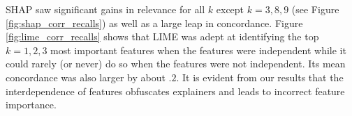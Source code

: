 \documentclass[mnsc,blindrev]{informs3}
\begin{document}
 SHAP saw significant gains in relevance for all $k$ except $k=3,8,9$ (see  Figure \ref{fig:shap_corr_recalls}) as well as a large leap in concordance. Figure \ref{fig:lime_corr_recalls} shows that LIME was adept at identifying the top $k=1,2,3$ most important features when the features were independent while it could rarely (or never) do so when the features were not independent. Its mean concordance was also larger by about $.2$. It is evident from our results that the interdependence of features obfuscates explainers and leads to incorrect feature importance.    

        
\end{document}
